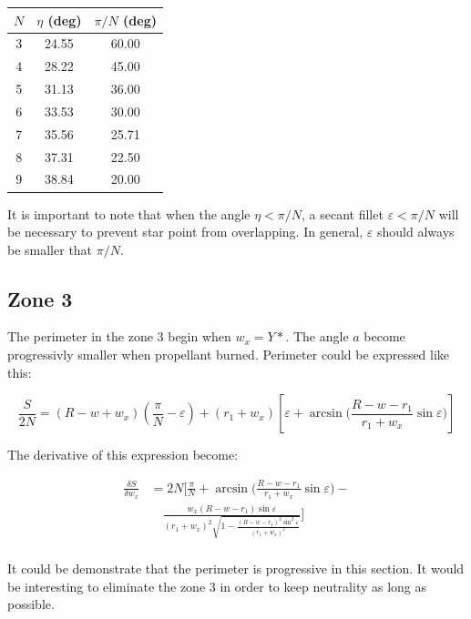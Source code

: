 \documentclass[11pt, titlepage]{article}
\begin{document}
\begin{center}
 \begin{tabular}{||c|c|c||}
  \hline
  \hline
  $N$ & $\eta$ (deg) & $\pi/N$ (deg) \\
  \hline
  3 & 24.55 & 60.00\\
  4 & 28.22 & 45.00\\
  5 & 31.13 & 36.00\\
  6 & 33.53 & 30.00\\
  7 & 35.56 & 25.71\\
  8 & 37.31 & 22.50\\
  9 & 38.84 & 20.00\\
  \hline
 \end{tabular}
\end{center}
  
  It is important to note that when the angle $\eta < \pi/N$, a secant
  fillet $\varepsilon < \pi/N$ will be necessary to prevent star point
  from overlapping. In general, $\varepsilon$ should always be smaller
  that $\pi/N$.
                 
  \subsection{Zone 3}

  The perimeter in the zone 3 begin when $w_x = Y*$. The angle $a$
  become progressivly smaller when propellant burned. Perimeter could
  be expressed like this:

\begin{equation}
\frac{S}{2N} = (R-w+w_x)(\frac{\pi}{N}-\varepsilon) + 
               (r_1+w_x)\left[ \varepsilon +
               \arcsin{(\frac{R-w-r_1}{r_1+w_x}\sin{\varepsilon}}) \right]
\end{equation}


  The derivative of this expression become:

\begin{equation}
\begin{split}
\frac{\delta S}{\delta w_x} &= 2N \biggl[ \frac{\pi}{N}  +
       \arcsin{\biggl(\frac{R-w-r_1}{r_1+w_x}\sin{\varepsilon}\biggr)} - \\
      &\quad  \frac{w_x(R-w-r_1)\sin{\varepsilon}}{(r_1+w_x)^2\sqrt{1-\frac{(R-w-r_1)^2\sin^2{\varepsilon}}{(r_1+w_x)^2}}} \biggr]\\
\end{split}
\end{equation}


  It could be demonstrate that the perimeter is progressive in this
  section. It would be interesting to eliminate the zone 3 in order to
  keep neutrality as long as possible.
\end{document}
